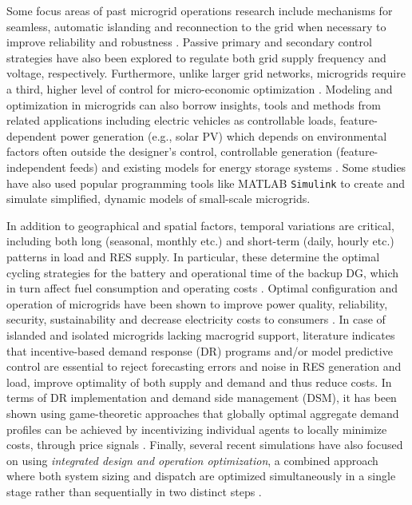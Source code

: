 \documentclass[final,3p,times]{elsarticle}
\begin{document}
Some focus areas of past microgrid operations research include mechanisms for seamless, automatic islanding and reconnection to the grid when necessary to improve reliability and robustness \cite{mg_review}. Passive primary and secondary control strategies have also been explored to regulate both grid supply frequency and voltage, respectively. Furthermore, unlike larger grid networks, microgrids require a third, higher level of control for micro-economic optimization \cite{mg_review}. Modeling and optimization in microgrids can also borrow insights, tools and methods from related applications including electric vehicles as controllable loads, feature-dependent power generation (e.g., solar PV) which depends on environmental factors often outside the designer's control, controllable generation (feature-independent feeds) and existing models for energy storage systems \cite{mg_mod_opt}. Some studies have also used popular programming tools like MATLAB \texttt{Simulink} to create and simulate simplified, dynamic models of small-scale microgrids.

In addition to geographical and spatial factors, temporal variations are critical, including both long (seasonal, monthly etc.) and short-term (daily, hourly etc.) patterns in load and RES supply. In particular, these determine the optimal cycling strategies for the battery and operational time of the backup DG, which in turn affect fuel consumption and operating costs \cite{tazvinga2013}. Optimal configuration and operation of microgrids have been shown to improve power quality, reliability, security, sustainability and decrease electricity costs to consumers \cite{pathak2017}. In case of islanded and isolated microgrids lacking macrogrid support, literature indicates that incentive-based demand response (DR) programs \cite{nwulu2017} and/or model predictive control \cite{zachar2016} are essential to reject forecasting errors and noise in RES generation and load, improve optimality of both supply and demand and thus reduce costs. In terms of DR implementation and demand side management (DSM), it has been shown using game-theoretic approaches that globally optimal aggregate demand profiles can be achieved by incentivizing individual agents to locally minimize costs, through price signals \cite{paola2017}. Finally, several recent simulations have also focused on using \textit{integrated design and operation optimization}, a combined approach where both system sizing and dispatch are optimized simultaneously in a single stage rather than sequentially in two distinct steps \cite{moshi2016}.
\end{document}
